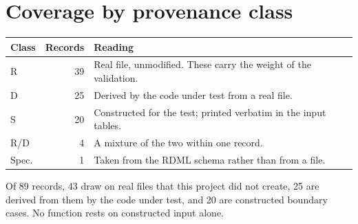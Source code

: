 \section{Coverage by provenance class}
\begin{longtable}{@{}p{30mm}r p{\dimexpr\linewidth-30mm-20mm-28pt\relax}@{}}
\toprule\textbf{Class}&\textbf{Records}&\textbf{Reading}\\\midrule\endhead

R & 39 & Real file, unmodified. These carry the weight of the validation. \\

D & 25 & Derived by the code under test from a real file. \\

S & 20 & Constructed for the test; printed verbatim in the input tables. \\

R/D & 4 & A mixture of the two within one record. \\

Spec. & 1 & Taken from the RDML schema rather than from a file. \\

\bottomrule\end{longtable}

Of 89 records, 43 draw on real files that this project did not create, 25 are derived from them by
the code under test, and 20 are constructed boundary cases. No function rests on constructed input
alone.

